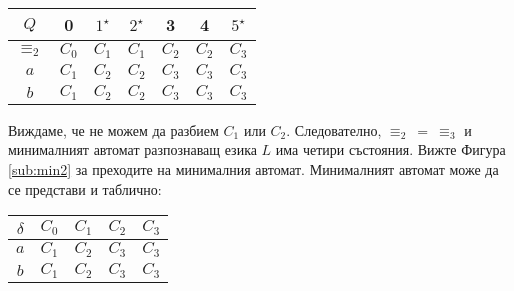 \begin{example}
\begin{itemize}
      \begin{tabular}{|c|c|c|c|c|c|c|}
        \hline
        $Q$ & 0 & $1^\star$ & $2^\star$ & 3 & 4 & $5^\star$ \\
        \hline
        \hline
        $\equiv_2$ & $C_0$ & $C_1$ & $C_1$ & $C_2$ & $C_2$ & $C_3$\\
        \hline
        $a$ & $C_1$ & $C_2$ & $C_2$ & $C_3$ & $C_3$ & $C_3$\\
        \hline
        $b$ & $C_1$ & $C_2$ & $C_2$ & $C_3$ & $C_3$ & $C_3$\\
        \hline
      \end{tabular}
      
      Виждаме, че не можем да разбием $C_1$ или $C_2$.
      Следователно, $\equiv_2\ =\ \equiv_3$ и минималният автомат разпознаващ езика $L$
      има четири състояния. Вижте Фигура \ref{sub:min2} за преходите на минималния автомат.
      Минималният автомат може да се представи и таблично:

      \begin{tabular}{|c|c|c|c|c|}
        \hline
        $\delta$ & $C_0$ & $C_1$ & $C_2$ & $C_3$ \\
        \hline
        $a$ & $C_1$ & $C_2$ & $C_3$ & $C_3$ \\
        \hline
        $b$ & $C_1$ & $C_2$ & $C_3$ & $C_3$ \\
        \hline
      \end{tabular}
      
  \end{itemize}
\end{example}


